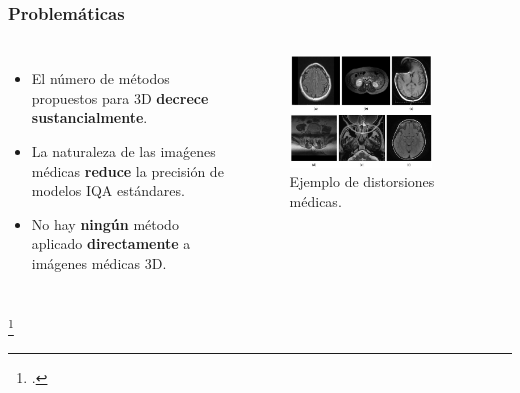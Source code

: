 \begin{frame}
  \frametitle{Problemáticas}
  \begin{columns}
  \begin{itemize}
    \item El número de métodos propuestos para 3D \textbf{decrece sustancialmente}.
    \item La naturaleza de las imaǵenes médicas \textbf{reduce} la precisión de modelos IQA estándares.
    \item No hay \textbf{ningún} método aplicado \textbf{directamente} a imágenes médicas 3D.
  \end{itemize}
  \begin{figure}
    \begin{center}
      \includegraphics[width=0.78\textwidth]{imagenes/chapter1/MedicalDistortions}
    \end{center}
    \caption{Ejemplo de distorsiones médicas\footnotemark.}
  \end{figure}
  \end{columns}
  \footcitetext{MoreMedicalDistortion}
\end{frame}

